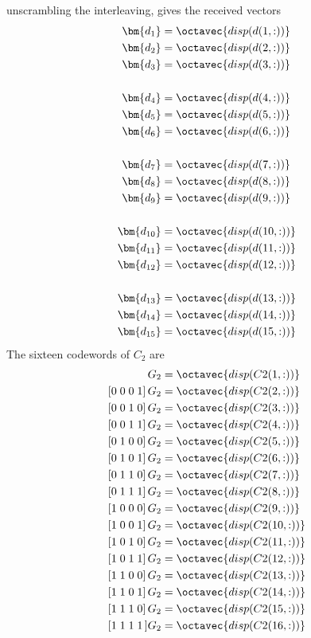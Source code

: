 unscrambling the interleaving, gives the received vectors
\begin{align*}
	\bm{d_1} &= \octavec{disp(d(1,:))}\\
	\bm{d_2} &= \octavec{disp(d(2,:))}\\
	\bm{d_3} &= \octavec{disp(d(3,:))}\\\\
	\bm{d_4} &= \octavec{disp(d(4,:))}\\
	\bm{d_5} &= \octavec{disp(d(5,:))}\\
	\bm{d_6} &= \octavec{disp(d(6,:))}\\\\
	\bm{d_7} &= \octavec{disp(d(7,:))}\\
	\bm{d_8} &= \octavec{disp(d(8,:))}\\
	\bm{d_9} &= \octavec{disp(d(9,:))}\\\\
	\bm{d_{10}} &= \octavec{disp(d(10,:))}\\
	\bm{d_{11}} &= \octavec{disp(d(11,:))}\\
	\bm{d_{12}} &= \octavec{disp(d(12,:))}\\\\
	\bm{d_{13}} &= \octavec{disp(d(13,:))}\\
	\bm{d_{14}} &= \octavec{disp(d(14,:))}\\
	\bm{d_{15}} &= \octavec{disp(d(15,:))}
\end{align*}
The sixteen codewords of $C_2$ are
\begin{align*}
	[0\;0\;0\;0]\,G_2 &= \octavec{disp(C2(1,:))}\\
	[0\;0\;0\;1]\,G_2 &= \octavec{disp(C2(2,:))}\\
	[0\;0\;1\;0]\,G_2 &= \octavec{disp(C2(3,:))}\\
	[0\;0\;1\;1]\,G_2 &= \octavec{disp(C2(4,:))}\\
	[0\;1\;0\;0]\,G_2 &= \octavec{disp(C2(5,:))}\\
	[0\;1\;0\;1]\,G_2 &= \octavec{disp(C2(6,:))}\\
	[0\;1\;1\;0]\,G_2 &= \octavec{disp(C2(7,:))}\\
	[0\;1\;1\;1]\,G_2 &= \octavec{disp(C2(8,:))}\\
	[1\;0\;0\;0]\,G_2 &= \octavec{disp(C2(9,:))}\\
	[1\;0\;0\;1]\,G_2 &= \octavec{disp(C2(10,:))}\\
	[1\;0\;1\;0]\,G_2 &= \octavec{disp(C2(11,:))}\\
	[1\;0\;1\;1]\,G_2 &= \octavec{disp(C2(12,:))}\\
	[1\;1\;0\;0]\,G_2 &= \octavec{disp(C2(13,:))}\\
	[1\;1\;0\;1]\,G_2 &= \octavec{disp(C2(14,:))}\\
	[1\;1\;1\;0]\,G_2 &= \octavec{disp(C2(15,:))}\\
	[1\;1\;1\;1\,]G_2 &= \octavec{disp(C2(16,:))}\\
\end{align*}
